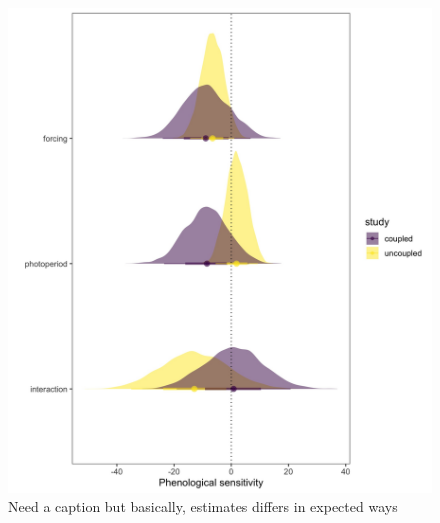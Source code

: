 \documentclass[11pt]{article}
\begin{document}
\begin{figure}[h!]
    \centering
 \includegraphics[width=\textwidth]{..//Plots/periodicity_figures/modelcomps.jpeg}
    \caption{Need a caption but basically, estimates differs in expected ways} 
    \label{fig:compy}
\end{figure}
 
\end{document}
